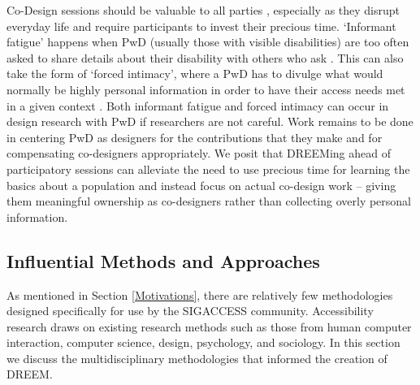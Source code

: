 Co-Design sessions should be valuable to all parties \cite{bodkerParticipatoryDesignThat2018}, especially as they disrupt everyday life and require participants to invest their precious time.  `Informant fatigue' happens when PwD (usually those with visible disabilities) are too often asked to share details about their disability with others who ask \cite{shinoharaSelfConsciousSelfConfidentDiary2016}. This can also take the form of `forced intimacy', where a PwD has to divulge what would normally be highly personal information in order to have their access needs met in a given context \cite{mingusForcedIntimacyAbleist2017}. Both informant fatigue and forced intimacy can occur in design research with PwD if researchers are not careful. Work remains to be done in centering PwD as designers for the contributions that they make \cite{bennettBiographicalPrototypesReimagining2019} and for compensating co-designers appropriately. We posit that DREEMing ahead of participatory sessions can alleviate the need to use precious time for learning the basics about a population and instead focus on actual co-design work -- giving them meaningful ownership as co-designers rather than collecting overly personal information.
			
\subsection{Influential Methods and Approaches}\label{influences}
As mentioned in Section \ref{Motivations}, there are relatively few methodologies designed specifically for use by the SIGACCESS community. Accessibility research draws on existing research methods such as those from human computer interaction, computer science, design, psychology, and sociology. In this section we discuss the multidisciplinary methodologies that informed the creation of DREEM. 

